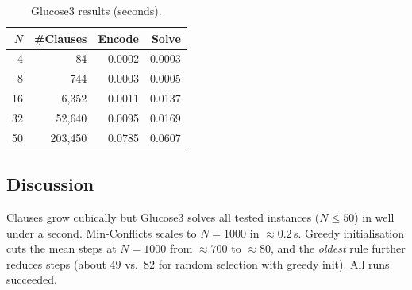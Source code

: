 \begin{table}[h]
\centering\caption{Glucose3 results (seconds).}
\begin{tabular}{rrrr}
\hline $N$ & \#Clauses & Encode & Solve\\\hline
4 & 84 & 0.0002 & 0.0003\\
8 & 744 & 0.0003 & 0.0005\\
16 & 6{,}352 & 0.0011 & 0.0137\\
32 & 52{,}640 & 0.0095 & 0.0169\\
50 & 203{,}450 & 0.0785 & 0.0607\\\hline
\end{tabular}
\end{table}


\subsection{Discussion}
Clauses grow cubically but Glucose3 solves all tested instances ($N\le 50$) in well under a
second. Min-Conflicts scales to $N=1000$ in $\approx0.2$\,s. Greedy initialisation cuts the mean steps
at $N=1000$ from $\approx 700$ to $\approx 80$, and the \emph{oldest} rule further reduces steps
(about $49$ vs.\ $82$ for random selection with greedy init). All runs succeeded.
